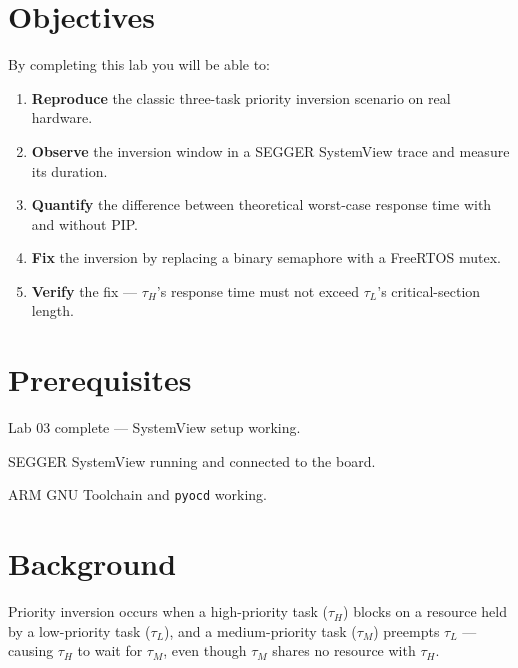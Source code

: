 \documentclass[11pt, a4paper]{article}
\begin{document}

\section{Objectives}

By completing this lab you will be able to:

\begin{enumerate}[noitemsep, leftmargin=*]
  \item \textbf{Reproduce} the classic three-task priority inversion scenario on real hardware.
  \item \textbf{Observe} the inversion window in a SEGGER SystemView trace and measure its
        duration.
  \item \textbf{Quantify} the difference between theoretical worst-case response time with and
        without PIP.
  \item \textbf{Fix} the inversion by replacing a binary semaphore with a FreeRTOS mutex.
  \item \textbf{Verify} the fix --- $\tau_H$'s response time must not exceed $\tau_L$'s
        critical-section length.
\end{enumerate}

\section{Prerequisites}

\begin{checklist}
  \item Lab 03 complete --- SystemView setup working.
  \item SEGGER SystemView running and connected to the board.
  \item ARM GNU Toolchain and \texttt{pyocd} working.
\end{checklist}

\section{Background}

Priority inversion occurs when a high-priority task ($\tau_H$) blocks on a resource held
by a low-priority task ($\tau_L$), and a medium-priority task ($\tau_M$) preempts
$\tau_L$ --- causing $\tau_H$ to wait for $\tau_M$, even though $\tau_M$ shares no
resource with $\tau_H$.
\end{document}
